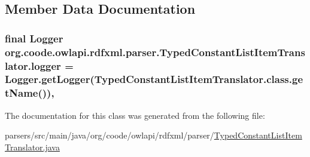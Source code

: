 \subsection{Member Data Documentation}
\hypertarget{classorg_1_1coode_1_1owlapi_1_1rdfxml_1_1parser_1_1_typed_constant_list_item_translator_a20131606c18310bc4b7381292f2abfd0}{
\subsubsection[{logger}]{\setlength{\rightskip}{0pt plus 5cm}final Logger org.\-coode.\-owlapi.\-rdfxml.\-parser.\-Typed\-Constant\-List\-Item\-Translator.\-logger = Logger.\-get\-Logger(Typed\-Constant\-List\-Item\-Translator.\-class.\-get\-Name())\hspace{0.3cm}{\ttfamily [static]}, {\ttfamily [private]}}}\label{classorg_1_1coode_1_1owlapi_1_1rdfxml_1_1parser_1_1_typed_constant_list_item_translator_a20131606c18310bc4b7381292f2abfd0}


The documentation for this class was generated from the following file\-:\begin{DoxyCompactItemize}
\item 
parsers/src/main/java/org/coode/owlapi/rdfxml/parser/\hyperlink{_typed_constant_list_item_translator_8java}{Typed\-Constant\-List\-Item\-Translator.\-java}\end{DoxyCompactItemize}
